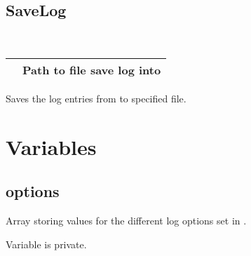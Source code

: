 \documentclass[letterpaper,10pt,english]{sphinxmanual}
\begin{document}
\subsection{SaveLog}
\label{\detokenize{log:savelog}}

\begin{fulllineitems}
\label{\detokenize{log:_CPPv2N6pessum7SaveLogENSt6stringE}}%
\pysigstartmultiline
{}%
\pysigstopmultiline~

\begin{savenotes}\sphinxattablestart
\centering
\begin{tabulary}{\linewidth}[t]{|T|T|}
\hline

&
Path to file save log into
\\
\hline
\end{tabulary}
\par
\sphinxattableend\end{savenotes}

Saves the log entries from {\hyperref[\detokenize{log:_CPPv2N6pessum11global_logsE}]{}} to specified file.

\end{fulllineitems}



\section{Variables}
\label{\detokenize{log:variables}}

\subsection{options}
\label{\detokenize{log:options}}

\begin{fulllineitems}
\label{\detokenize{log:_CPPv2N6pessum7optionsE}}%
\pysigstartmultiline
{}%
\pysigstopmultiline
Array storing values for the different log options set in {\hyperref[\detokenize{log:_CPPv2N6pessum12SetLogOptionEii}]{}}.

 Variable is private.

\end{fulllineitems}
\end{document}
